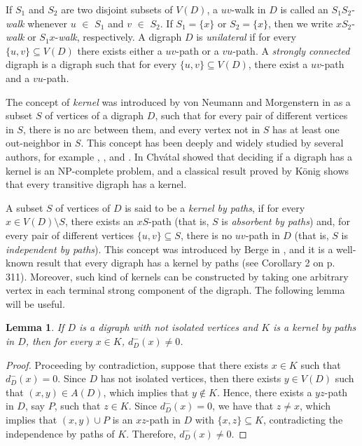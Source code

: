 \documentclass[10pt,a4paper]{article}
\newtheorem{lemma}[theorem]{Lemma}
\begin{document}
If $S_1$ and $S_2$ are two disjoint subsets of  $V(D)$, a $uv$-walk  in  $D$ is called an $S_1S_2$-\emph{walk} whenever $u$ $\in$ $S_1$ and $v$ $\in$ $S_2$. If $S_1 = \{x\}$ or $S_2 = \{x\}$, then we write $xS_2$-\emph{walk} or $S_1x$-\emph{walk}, respectively. 
A digraph $D$ is \textit{unilateral} if for every $\{u,v\} \subseteq V(D)$ there exists either a $uv$-path or a $vu$-path. A \textit{strongly connected} digraph is a digraph such that for every $\{u,v\} \subseteq V(D)$, there exist a $uv$-path and a $vu$-path. 

The concept of \emph{kernel} was introduced by von Neumann and Morgenstern in \cite{2} as a subset $S$ of vertices of a digraph $D$, such that for every pair of different vertices in $S$, there is no arc between them, and every vertex not in $S$ has at least one out-neighbor in $S$. This concept has been deeply and widely studied by several authors, for example \cite{ker1}, \cite{ker2}, \cite{ker3} and \cite{ker4}. In \cite{3} Chvátal showed that deciding if a digraph has a kernel is an NP-complete problem, and a classical result proved by König \cite{kon} shows that every transitive digraph has a kernel.

A subset $S$ of vertices of $D$ is said to be a \emph{kernel by paths}, if for every $x \in V(D)\setminus S$, there exists an $xS$-path (that is, $S$ is \emph{absorbent by paths}) and, for every pair of different vertices $\{ u, v \} \subseteq S$, there is no $uv$-path in $D$ (that is, $S$ is \emph{independent by paths}). 
This concept was introduced by Berge in \cite{19}, and it is a well-known result that every digraph has a kernel by paths \cite{19} (see Corollary 2 on p. 311). Moreover, such kind of kernels can be constructed by taking one arbitrary vertex in each terminal strong component of the digraph. The following lemma will be useful.

\begin{lemma}
\label{c0.l1}
If $D$ is a digraph with not isolated vertices and $K$ is a kernel by paths in $D$, then for every $x \in K$, $d^{-}_{D}(x) \neq 0$.
\end{lemma}
\begin{proof}
Proceeding by contradiction, suppose that there exists $x \in K$ such that $d^{-}_{D}(x) = 0$. Since $D$ has not isolated vertices, then there exists $y \in V(D)$ such that $(x,y) \in A(D)$, which implies that $y \notin K$. Hence, there exists a $yz$-path in $D$, say $P$, such that $z \in K$. Since $d^{-}_{D}(x)=0$, we have that $z \neq x$, which implies that $(x,y) \cup P$ is an $xz$-path in $D$ with $\{ x,z \} \subseteq K$, contradicting the independence by paths of $K$. Therefore, $d^{-}_{D}(x) \neq 0$.
\end{proof}
\end{document}
